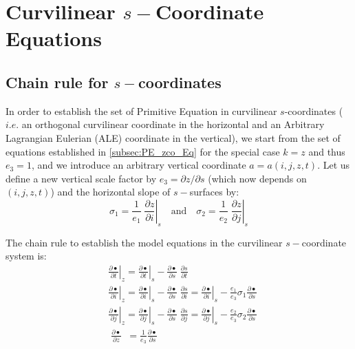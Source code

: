 \documentclass[../main/NEMO_manual]{subfiles}
\begin{document}
\chapter{Curvilinear $s-$Coordinate Equations}
\label{apdx:A}

\minitoc

\newpage

\section{Chain rule for $s-$coordinates}
\label{sec:A_chain}

In order to establish the set of Primitive Equation in curvilinear $s$-coordinates
($i.e.$ an orthogonal curvilinear coordinate in the horizontal and
an Arbitrary Lagrangian Eulerian (ALE) coordinate in the vertical),
we start from the set of equations established in \autoref{subsec:PE_zco_Eq} for
the special case $k = z$ and thus $e_3 = 1$,
and we introduce an arbitrary vertical coordinate $a = a(i,j,z,t)$.
Let us define a new vertical scale factor by $e_3 = \partial z / \partial s$ (which now depends on $(i,j,z,t)$) and
the horizontal slope of $s-$surfaces by:
\begin{equation}
  \label{apdx:A_s_slope}
  \sigma_1 =\frac{1}{e_1 }\;\left. {\frac{\partial z}{\partial i}} \right|_s
  \quad \text{and} \quad
  \sigma_2 =\frac{1}{e_2 }\;\left. {\frac{\partial z}{\partial j}} \right|_s
\end{equation}

The chain rule to establish the model equations in the curvilinear $s-$coordinate system is:
\begin{equation}
  \label{apdx:A_s_chain_rule}
  \begin{aligned}
    &\left. {\frac{\partial \bullet }{\partial t}} \right|_z  =
    \left. {\frac{\partial \bullet }{\partial t}} \right|_s
	 -\frac{\partial \bullet }{\partial s}\;\frac{\partial s}{\partial t} \\
    &\left. {\frac{\partial \bullet }{\partial i}} \right|_z  =
    \left. {\frac{\partial \bullet }{\partial i}} \right|_s
    -\frac{\partial \bullet }{\partial s}\;\frac{\partial s}{\partial i}=
    \left. {\frac{\partial \bullet }{\partial i}} \right|_s
    -\frac{e_1 }{e_3 }\sigma_1 \frac{\partial \bullet }{\partial s} \\
    &\left. {\frac{\partial \bullet }{\partial j}} \right|_z  =
    \left. {\frac{\partial \bullet }{\partial j}} \right|_s
    - \frac{\partial \bullet }{\partial s}\;\frac{\partial s}{\partial j}=
    \left. {\frac{\partial \bullet }{\partial j}} \right|_s
    - \frac{e_2 }{e_3 }\sigma_2 \frac{\partial \bullet }{\partial s} \\
    &\;\frac{\partial \bullet }{\partial z}  \;\; = \frac{1}{e_3 }\frac{\partial \bullet }{\partial s}
  \end{aligned}
\end{equation}
\end{document}
